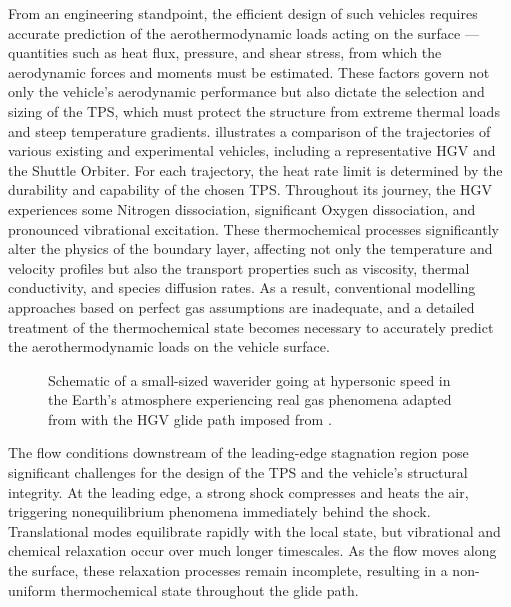 From an engineering standpoint, the efficient design of such vehicles requires accurate prediction of the aerothermodynamic loads acting on the surface — quantities such as heat flux, pressure, and shear stress, from which the aerodynamic forces and moments must be estimated. These factors govern not only the vehicle’s aerodynamic performance but also dictate the selection and sizing of the \gls{TPS}, which must protect the structure from extreme thermal loads and steep temperature gradients.  illustrates a comparison of the trajectories of various existing and experimental vehicles, including a representative \gls{HGV} \citep{Rizvi2015} and the Shuttle Orbiter. For each trajectory, the heat rate limit is determined by the durability and capability of the chosen \gls{TPS}. Throughout its journey, the \gls{HGV} experiences some Nitrogen dissociation, significant Oxygen dissociation, and pronounced vibrational excitation. These thermochemical processes significantly alter the physics of the boundary layer, affecting not only the temperature and velocity profiles but also the transport properties such as viscosity, thermal conductivity, and species diffusion rates. As a result, conventional modelling approaches based on perfect gas assumptions are inadequate, and a detailed treatment of the thermochemical state becomes necessary to accurately predict the aerothermodynamic loads on the vehicle surface.



\begin{figure}[hbt!]
    \centering
    \fontsize{8}{9}\selectfont
    \caption{Schematic of a small-sized waverider going at hypersonic speed in the Earth’s atmosphere experiencing real gas phenomena adapted from \citep{Anderson2019} with the HGV glide path imposed from \citep{Rizvi2015}.}
    \label{figure:trajectory}
\end{figure}


The flow conditions downstream of the leading-edge stagnation region pose significant challenges for the design of the \gls{TPS} and the vehicle’s structural integrity. At the leading edge, a strong shock compresses and heats the air, triggering nonequilibrium phenomena immediately behind the shock. Translational modes equilibrate rapidly with the local state, but vibrational and chemical relaxation occur over much longer timescales. As the flow moves along the surface, these relaxation processes remain incomplete, resulting in a non-uniform thermochemical state throughout the glide path.

